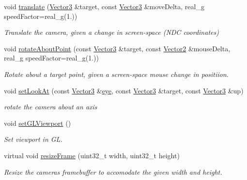 \begin{Indent}
\begin{DoxyCompactItemize}
void \mbox{\hyperlink{classrev_1_1_camera_a82e1f7d37a5a13ebd824c296979ac736}{translate}} (\mbox{\hyperlink{classrev_1_1_vector}{Vector3}} \&target, const \mbox{\hyperlink{classrev_1_1_vector}{Vector3}} \&move\+Delta, real\+\_\+g speed\+Factor=real\+\_\+g(1.))
\begin{DoxyCompactList}\small\item\em Translate the camera, given a change in screen-\/space (N\+DC coordinates) \end{DoxyCompactList}\item 
\mbox{\label{classrev_1_1_camera_a8818fa599abae940e6eee19fd52b994f}} 
void \mbox{\hyperlink{classrev_1_1_camera_a8818fa599abae940e6eee19fd52b994f}{rotate\+About\+Point}} (const \mbox{\hyperlink{classrev_1_1_vector}{Vector3}} \&target, const \mbox{\hyperlink{classrev_1_1_vector}{Vector2}} \&mouse\+Delta, real\+\_\+g speed\+Factor=real\+\_\+g(1.))
\begin{DoxyCompactList}\small\item\em Rotate about a target point, given a screen-\/space mouse change in positiion. \end{DoxyCompactList}\item 
void \mbox{\hyperlink{classrev_1_1_camera_a64f10bf208e61d9750caa1aecca5a4fa}{set\+Look\+At}} (const \mbox{\hyperlink{classrev_1_1_vector}{Vector3}} \&\mbox{\hyperlink{classrev_1_1_camera_af3be583f0c817c5251bae6c5617b41f8}{eye}}, const \mbox{\hyperlink{classrev_1_1_vector}{Vector3}} \&target, const \mbox{\hyperlink{classrev_1_1_vector}{Vector3}} \&up)
\begin{DoxyCompactList}\small\item\em rotate the camera about an axis \end{DoxyCompactList}\item 
\mbox{\label{classrev_1_1_camera_ab802c3a14ed9f90b621d9c25896331cf}} 
void \mbox{\hyperlink{classrev_1_1_camera_ab802c3a14ed9f90b621d9c25896331cf}{set\+G\+L\+Viewport}} ()
\begin{DoxyCompactList}\small\item\em Set viewport in GL. \end{DoxyCompactList}\item 
virtual void \mbox{\hyperlink{classrev_1_1_camera_a38127b7e39468bb9116f3bcc3b3bcb1f}{resize\+Frame}} (uint32\+\_\+t width, uint32\+\_\+t height)
\begin{DoxyCompactList}\small\item\em Resize the camera\textquotesingle{}s framebuffer to accomodate the given width and height. \end{DoxyCompactList}\item 

\end{DoxyCompactItemize}
\end{Indent}

